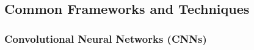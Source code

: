 %
%
%
%
%
%    
%
%
%    
%
%
%
%
\subsection{Common Frameworks and Techniques}

\subsubsection{Convolutional Neural Networks (CNNs)\label{ssec:cnn}}

